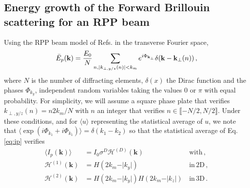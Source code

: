 \documentclass[
 reprint,
 amsmath,amssymb,
 aps,
]{revtex4-1}
\begin{document}
\begin{widetext}
 \subsection{Energy growth of the Forward Brillouin scattering for an RPP beam }
 Using the  RPP  beam model of Refs. \cite[]{POF_Schmitt_88,POF_Rose_93} in the transverse Fourier space,
 \begin{align}
 \Bar{E}_p(\mathbf{k}) = \frac{E_0}{N} \sum_{n,\vert k_{\perp,y/z}(n)\vert<k_m } e^{i\Phi_{\mathbf{k}_\perp}}\delta(\mathbf{k}  - \mathbf{k}_\perp(n))\, , \label{eq:erpp}
 \end{align}
 where  $N$ is the number of diffracting elements, 
 $\delta(x)$ the Dirac function and the phases $\Phi_{k_y}$,  independent random variables taking the values $0$ or $\pi$ with equal probability.
 For simplicity, we will assume a square phase plate that verifies $k_{\perp,y/z}(n) = n2k_m/N$ with $n$ an integer that verifies $n\in \llbracket - N/2 ,N/2 \rrbracket$. 
 Under these conditions, and for $\langle u\rangle$ representing the statistical average of $u$,  we note   that $\langle\exp(i\Phi_{k_1}+i\Phi_{k_1})\rangle=\delta(k_1-k_2) $ so that  the statistical average  of Eq. \eqref{eq:ip} verifies
   \begin{align}
   \langle I_p(\mathbf{k})\rangle &= I_0 \sigma ^D \mathcal{H}^{(D)}(\mathbf{k})  &\,  \mathrm{with} \, ,\\ 
   \mathcal{H}^{(1)}(\mathbf{k}) &= H(2k_m - \vert k_y \vert ) &\,  \mathrm{in}\, \mathrm{2D} \, ,\\ 
    \mathcal{H}^{(2)}(\mathbf{k}) &=   H(2k_m - \vert k_y \vert ) H(2k_m - \vert k_z \vert ) &\,  \mathrm{in}\, \mathrm{3D} \, .

\end{align}
\end{widetext}
\end{document}
